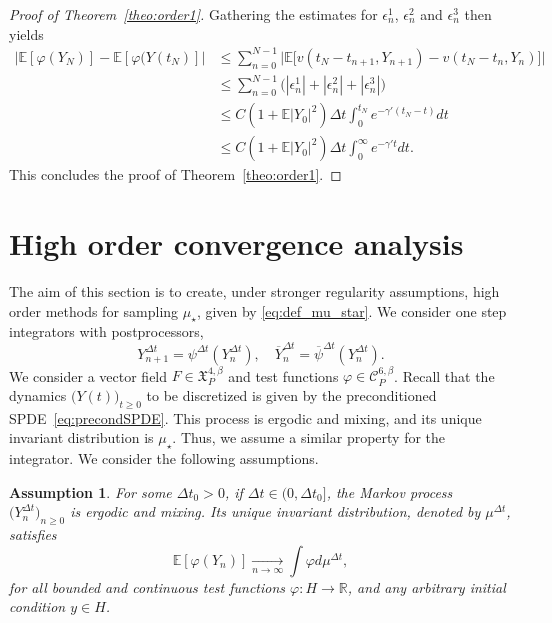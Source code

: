 \documentclass[11pt]{amsart}
\newcommand{\E}{\mathbb{E}}
\newcommand{\R}{\mathbb{R}}
\newtheorem{ass}{Assumption}
\begin{document}
\begin{proof}[Proof of Theorem~\ref{theo:order1}]
Gathering the estimates for $\epsilon_n^1$, $\epsilon_n^2$ and $\epsilon_n^3$ then yields
\begin{align*}
\Big|\E[\varphi(Y_N)]-\E[\varphi(Y(t_N)]\Big|&\le \sum_{n=0}^{N-1}\Big|\E\bigl[v(t_N-t_{n+1},Y_{n+1})-v(t_N-t_n,Y_n)\bigr]\Big|\\
&\le \sum_{n=0}^{N-1}\bigl(|\epsilon_n^1|+|\epsilon_n^2|+|\epsilon_n^3|\bigr)\\
&\le C(1+\E|Y_0|^2)\Delta t\int_{0}^{t_N}e^{-\gamma'(t_N-t)}dt\\
&\le C(1+\E|Y_0|^2)\Delta t\int_{0}^{\infty}e^{-\gamma' t}dt.
\end{align*}
This concludes the proof of Theorem~\ref{theo:order1}.
\end{proof}















\section{High order convergence analysis}
\label{section:high_order_inv_meas}

The aim of this section is to create, under stronger regularity assumptions, high order methods for sampling $\mu_\star$, given by \eqref{eq:def_mu_star}.
We consider one step integrators with postprocessors,
\[
Y_{n+1}^{\Delta t}=\psi^{\Delta t}(Y_n^{\Delta t}),
\quad
\overline{Y}_n^{\Delta t}=\overline{\psi}^{\Delta t}(Y_n^{\Delta t}).
\]
%
We consider a vector field $F\in \mathfrak{X}^{4,\beta}_P$ and test functions $\varphi\in\mathcal{C}^{6,\beta}_P$.
%
Recall that the dynamics $\bigl(Y(t)\bigr)_{t\ge 0}$ to be discretized is given by the preconditioned SPDE~\eqref{eq:precondSPDE}. This process is ergodic and mixing, and its unique invariant distribution is $\mu_\star$.
Thus, we assume a similar property for the integrator.
We consider the following assumptions.
\begin{ass}
\label{ass:ergodic_num}
For some $\Delta t_0>0$, if $\Delta t\in(0,\Delta t_0]$, the Markov process $\bigl(Y_n^{\Delta t}\bigr)_{n\ge 0}$ is ergodic and mixing. Its unique invariant distribution, denoted by $\mu^{\Delta t}$, satisfies
\[
\E[\varphi(Y_n)]\underset{n\to\infty}\to \int \varphi d\mu^{\Delta t},
\]
for all bounded and continuous test functions $\varphi:H\to \R$, and any arbitrary initial condition $y\in H$.
\end{ass}
\end{document}
